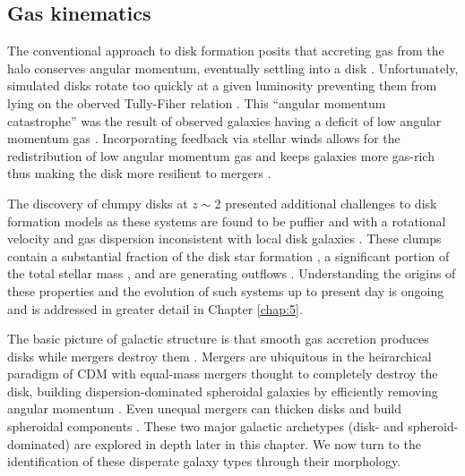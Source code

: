 \subsection{Gas kinematics}
\label{sec: gas kinematics}

The conventional approach to disk formation posits that accreting gas from the halo conserves angular momentum, eventually settling into a disk \citep{Fall1980,Mo1998}. Unfortunately, simulated disks rotate too quickly at a given luminosity preventing them from lying on the oberved Tully-Fiher relation \citep[e.g, review by][]{Brooks2010}. This ``angular momentum catastrophe'' was the result of observed galaxies having a deficit of low angular momentum gas \citep{Bullock2001,vandenBosch2001}. Incorporating feedback via stellar winds allows for the redistribution of low angular momentum gas and keeps galaxies more gas-rich thus making the disk more resilient to mergers \citep{Governato2009,Robertson2006,Brook2012}. 

The discovery of clumpy disks at $z\sim2$ \citep{Elmegreen2005} presented additional challenges to disk formation models as these systems are found to be puffier and with a rotational velocity and gas dispersion inconsistent with local disk galaxies \citep{ForsterSchreiber2009}. These clumps contain a substantial fraction of the disk star formation \citep{Guo2012}, a significant portion of the total stellar mass \citep{WuFoSch2012}, and are generating outflows \citep{Genzel2011}. Understanding the origins of these properties and the evolution of such systems up to present day is ongoing and is addressed in greater detail in Chapter \ref{chap:5}. 


The basic picture of galactic structure is that smooth gas accretion produces disks while mergers destroy them \citep{Toomre1977}. Mergers are ubiquitous in the heirarchical paradigm of CDM with equal-mass mergers thought to completely destroy the disk, building dispersion-dominated spheroidal galaxies by efficiently removing angular momentum \citep{Barnes1992,Mihos1996}. Even unequal mergers can thicken disks and build spheroidal components \citep{Moster2010}. These two major galactic archetypes (disk- and spheroid-dominated) are explored in depth later in this chapter. We now turn to the identification of these disperate galaxy types through their morphology.





